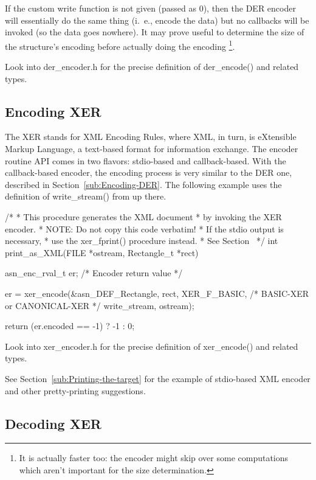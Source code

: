 \documentclass[english,oneside,12pt]{book}
\begin{document}
If the custom write function is not given (passed as 0), then the
DER encoder will essentially do the same thing (i.~e., encode the data)
but no callbacks will be invoked (so the data goes nowhere). It may
prove useful to determine the size of the structure's encoding before
actually doing the encoding%
\footnote{It is actually faster too: the encoder might skip over some computations
which aren't important for the size determination.%
}.

Look into der\_encoder.h for the precise definition of der\_encode()
and related types.


\subsection{\label{sub:Encoding-XER}Encoding XER}

The XER stands for XML Encoding Rules, where XML, in turn, is eXtensible
Markup Language, a text-based format for information exchange. The
encoder routine API comes in two flavors: stdio-based and callback-based.
With the callback-based encoder, the encoding process is very similar
to the DER one, described in Section~\ref{sub:Encoding-DER}. The
following example uses the definition of write\_stream() from up there.
\begin{codesample}
/*
 * This procedure generates the XML document
 * by invoking the XER encoder.
 * NOTE: Do not copy this code verbatim!
 *       If the stdio output is necessary,
 *       use the xer_fprint() procedure instead.
 *       See Section~%
 */
int
print_as_XML(FILE *ostream, Rectangle_t *rect) {
    asn_enc_rval_t er;  /* Encoder return value */

    er = xer_encode(&asn_DEF_Rectangle, rect,
        XER_F_BASIC, /* BASIC-XER or CANONICAL-XER */
        write_stream, ostream);

    return (er.encoded == -1) ? -1 : 0;
}
\end{codesample}
Look into xer\_encoder.h for the precise definition of xer\_encode()
and related types.

See Section~\ref{sub:Printing-the-target} for the example of stdio-based
XML encoder and other pretty-printing suggestions.


\subsection{\label{sub:Decoding-XER}Decoding XER}
\end{document}
